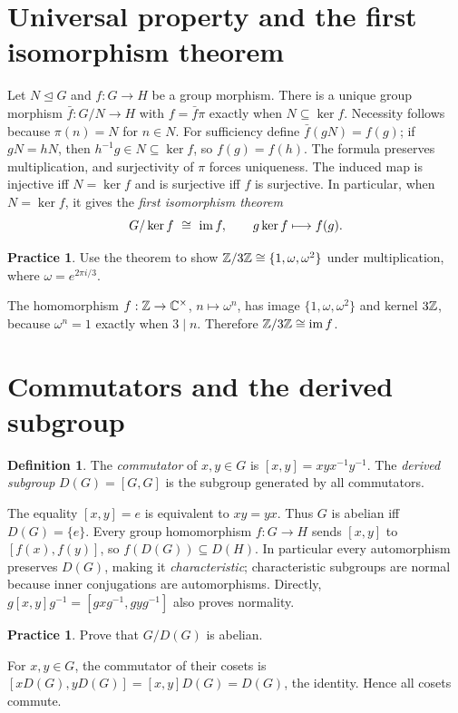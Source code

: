 \documentclass[11pt,openany]{book}
\newcommand{\C}{\mathbb C}\newcommand{\PP}{\mathcal P}
\theoremstyle{definition}
\newtheorem{definition}[theorem]{Definition}
\newtheorem{exercise}[theorem]{Practice}
\begin{document}
\section{Universal property and the first isomorphism theorem}
Let $N\trianglelefteq G$ and $f:G\to H$ be a group morphism. There is a unique group morphism $\bar f:G/N\to H$ with $f=\bar f\pi$ exactly when $N\subseteq\ker f$. Necessity follows because $\pi(n)=N$ for $n\in N$. For sufficiency define $\bar f(gN)=f(g)$; if $gN=hN$, then $h^{-1}g\in N\subseteq\ker f$, so $f(g)=f(h)$. The formula preserves multiplication, and surjectivity of $\pi$ forces uniqueness.
The induced map is injective iff $N=\ker f$ and is surjective iff $f$ is surjective. In particular, when $N=\ker f$, it gives the \emph{first isomorphism theorem}
\[G/\ker f\ \cong\ \operatorname{im} f,\qquad g\ker f\longmapsto f(g).\]
\begin{exercise}Use the theorem to show $\mathbb Z/3\mathbb Z\cong\{1,\omega,\omega^2\}$ under multiplication, where $\omega=e^{2\pi i/3}$.\end{exercise}
\begin{solution}The homomorphism $f:\Z\to\C^\times$, $n\mapsto\omega^n$, has image $\{1,\omega,\omega^2\}$ and kernel $3\mathbb Z$, because $\omega^n=1$ exactly when $3\mid n$. Therefore $\mathbb Z/3\mathbb Z\cong\operatorname{im} f$.\end{solution}

\section{Commutators and the derived subgroup}
\begin{definition}The \emph{commutator} of $x,y\in G$ is $[x,y]=xyx^{-1}y^{-1}$. The \emph{derived subgroup} $D(G)=[G,G]$ is the subgroup generated by all commutators.\end{definition}
The equality $[x,y]=e$ is equivalent to $xy=yx$. Thus $G$ is abelian iff $D(G)=\{e\}$. Every group homomorphism $f:G\to H$ sends $[x,y]$ to $[f(x),f(y)]$, so $f(D(G))\subseteq D(H)$. In particular every automorphism preserves $D(G)$, making it \emph{characteristic}; characteristic subgroups are normal because inner conjugations are automorphisms. Directly, $g[x,y]g^{-1}=[gxg^{-1},gyg^{-1}]$ also proves normality.
\begin{exercise}Prove that $G/D(G)$ is abelian.\end{exercise}
\begin{solution}For $x,y\in G$, the commutator of their cosets is $[xD(G),yD(G)]=[x,y]D(G)=D(G)$, the identity. Hence all cosets commute.\end{solution}
\end{document}
